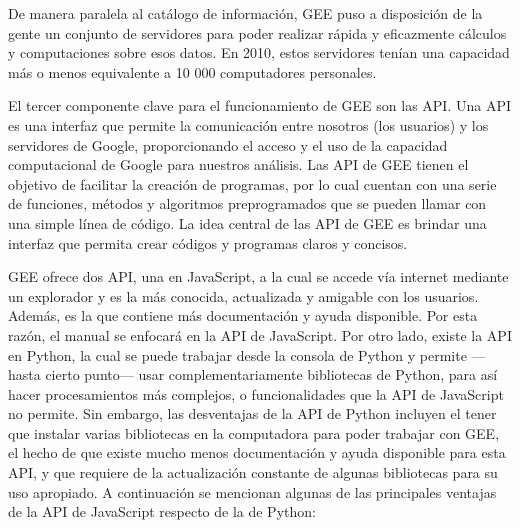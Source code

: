 \documentclass[
  12pt,
  letterpaper,
  twoside]{book}
\begin{document}
De manera paralela al catálogo de información, GEE puso a disposición de la gente un conjunto de servidores para poder realizar rápida y eficazmente cálculos y computaciones sobre esos datos. En 2010, estos servidores tenían una capacidad más o menos equivalente a 10 000 computadores personales.

El tercer componente clave para el funcionamiento de GEE son las API. Una API es una interfaz que permite la comunicación entre nosotros (los usuarios) y los servidores de Google, proporcionando el acceso y el uso de la capacidad computacional de Google para nuestros análisis. Las API de GEE tienen el objetivo de facilitar la creación de programas, por lo cual cuentan con una serie de funciones, métodos y algoritmos preprogramados que se pueden llamar con una simple línea de código. La idea central de las API de GEE es brindar una interfaz que permita crear códigos y programas claros y concisos.

GEE ofrece dos API, una en JavaScript, a la cual se accede vía internet mediante un explorador y es la más conocida, actualizada y amigable con los usuarios. Además, es la que contiene más documentación y ayuda disponible. Por esta razón, el manual se enfocará en la API de JavaScript. Por otro lado, existe la API en Python, la cual se puede trabajar desde la consola de Python y permite ---hasta cierto punto--- usar complementariamente bibliotecas de Python, para así hacer procesamientos más complejos, o funcionalidades que la API de JavaScript no permite. Sin embargo, las desventajas de la API de Python incluyen el tener que instalar varias bibliotecas en la computadora para poder trabajar con GEE, el hecho de que existe mucho menos documentación y ayuda disponible para esta API, y que requiere de la actualización constante de algunas bibliotecas para su uso apropiado. A continuación se mencionan algunas de las principales ventajas de la API de JavaScript respecto de la de Python:
\end{document}
